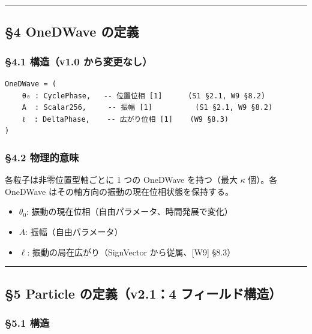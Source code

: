 \documentclass[a4paper,11pt]{ltjsarticle}
\providecommand{\tightlist}{\setlength{\itemsep}{0pt}\setlength{\parskip}{0pt}}
\begin{document}
\begin{center}\rule{0.5\linewidth}{0.5pt}\end{center}

\subsection{§4 OneDWave の定義}\label{onedwave-ux306eux5b9aux7fa9}

\subsubsection{§4.1 構造（v1.0
から変更なし）}\label{ux69cbux9020v1.0-ux304bux3089ux5909ux66f4ux306aux3057}

\begin{verbatim}
OneDWave = (
    θ₀ : CyclePhase,   -- 位置位相 [1]      (S1 §2.1, W9 §8.2)
    A  : Scalar256,     -- 振幅 [1]          (S1 §2.1, W9 §8.2)
    ℓ  : DeltaPhase,    -- 広がり位相 [1]    (W9 §8.3)
)
\end{verbatim}

\subsubsection{§4.2 物理的意味}\label{ux7269ux7406ux7684ux610fux5473-1}

各粒子は非零位置型軸ごとに 1 つの OneDWave を持つ（最大 \(\kappa\)
個）。各 OneDWave はその軸方向の振動の現在位相状態を保持する。

\begin{itemize}
\tightlist
\item
  \(\theta_0\): 振動の現在位相（自由パラメータ、時間発展で変化）
\item
  \(A\): 振幅（自由パラメータ）
\item
  \(\ell\): 振動の局在広がり（SignVector から従属、{[}W9{]} §8.3）
\end{itemize}

\begin{center}\rule{0.5\linewidth}{0.5pt}\end{center}

\subsection{§5 Particle の定義（v2.1：4
フィールド構造）}\label{particle-ux306eux5b9aux7fa9v2.14-ux30d5ux30a3ux30fcux30ebux30c9ux69cbux9020}

\subsubsection{§5.1 構造}\label{ux69cbux9020-1}
\end{document}
